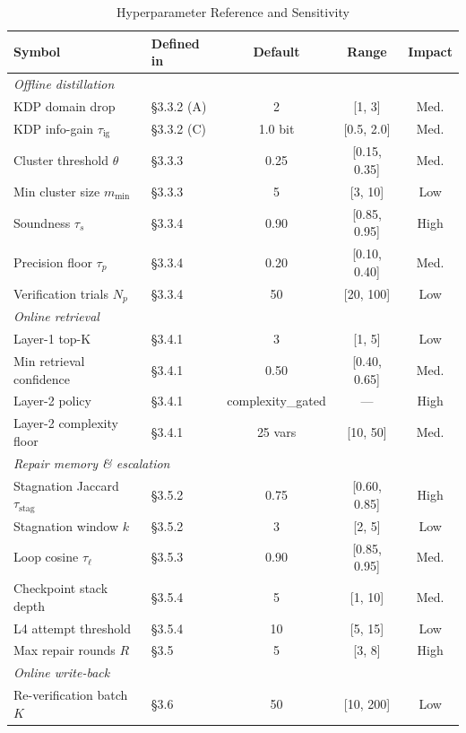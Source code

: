 \begin{table}[h]
\centering
\caption{Hyperparameter Reference and Sensitivity}
\small
\setlength{\tabcolsep}{3pt}
\begin{tabular}{|l|l|c|c|c|}
\hline
\textbf{Symbol} & \textbf{Defined in} & \textbf{Default} & \textbf{Range} & \textbf{Impact} \\
\hline
\multicolumn{5}{|l|}{\textit{Offline distillation}} \\
\hline
KDP domain drop & §3.3.2 (A)  & 2     & [1, 3]      & Med. \\
KDP info-gain $\tau_{\text{ig}}$ & §3.3.2 (C) & 1.0 bit & [0.5, 2.0] & Med. \\
Cluster threshold $\theta$ & §3.3.3 & 0.25  & [0.15, 0.35]& Med. \\
Min cluster size $m_{\min}$ & §3.3.3 & 5 & [3, 10] & Low \\
Soundness $\tau_s$ & §3.3.4 & 0.90 & [0.85, 0.95] & High \\
Precision floor $\tau_p$ & §3.3.4 & 0.20 & [0.10, 0.40] & Med. \\
Verification trials $N_p$ & §3.3.4 & 50 & [20, 100] & Low \\
\hline
\multicolumn{5}{|l|}{\textit{Online retrieval}} \\
\hline
Layer-1 top-K & §3.4.1 & 3 & [1, 5] & Low \\
Min retrieval confidence & §3.4.1 & 0.50 & [0.40, 0.65] & Med. \\
Layer-2 policy & §3.4.1 & complexity\_gated & — & High \\
Layer-2 complexity floor & §3.4.1 & 25 vars & [10, 50] & Med. \\
\hline
\multicolumn{5}{|l|}{\textit{Repair memory \& escalation}} \\
\hline
Stagnation Jaccard $\tau_{\text{stag}}$ & §3.5.2 & 0.75 & [0.60, 0.85] & High \\
Stagnation window $k$ & §3.5.2 & 3 & [2, 5] & Low \\
Loop cosine $\tau_\ell$ & §3.5.3 & 0.90 & [0.85, 0.95] & Med. \\
Checkpoint stack depth & §3.5.4 & 5 & [1, 10] & Med. \\
L4 attempt threshold & §3.5.4 & 10 & [5, 15] & Low \\
Max repair rounds $R$ & §3.5 & 5 & [3, 8] & High \\
\hline
\multicolumn{5}{|l|}{\textit{Online write-back}} \\
\hline
Re-verification batch $K$ & §3.6 & 50 & [10, 200] & Low \\
\hline
\end{tabular}
\end{table}

